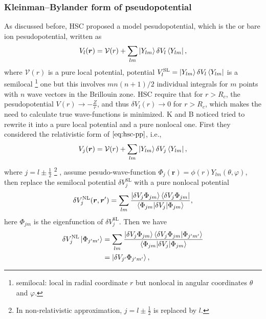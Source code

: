 
\subsubsection{Kleinman--Bylander form of pseudopotential}
As discussed before,
HSC proposed a model pesudopotential, which is the or bare ion pesudopotential, written as
\begin{equation}\label{eq:hsc-pp}
	V_l(\bm{r}) = \mathcal{V} (r) + \sum_{l m} \ket{Y_{lm}} \delta V_l \bra{Y_{lm}},
\end{equation}
where $\mathcal{V} (r)$ is a pure local potential, potential
$V_l^\text{SL} = \ket{Y_{lm}} \delta V_l \bra{Y_{lm}}$ is a semilocal
\footnote{
	semilocal: local in radial coordinate $r$ but nonlocal in angular coordinates $\theta$ and $\varphi$.
}
one but this involves $m n (n+1) / 2$ individual integrals for $m$ points
with $n$ wave vectors in the Brillouin zone.
HSC require that for $r > R_c$, the pesudopotential
$V (r) \rightarrow - \frac{ Z }{ r }$, and thus
$\delta V_l (r) \rightarrow 0 $ for $r > R_c$,
which makes the need to calculate true wave-functions is minimized.
K and B \cite{Kleinman:1982cx} noticed tried to rewrite it into a pure local potential and a pure
nonlocal one. First they considered the relativistic form of $\eqref{eq:hsc-pp}$,
i.e.,
\begin{equation}
	V_j(\bm{r}) = \mathcal{V} (r) + \sum_{lm} \ket{Y_{lm}} \delta V_j \bra{Y_{lm}},
\end{equation}
where $j = l \pm \frac{ 1 }{ 2 }$
\footnote{
	In non-relativistic approximation, $j = l \pm \frac{ 1 }{ 2 }$ is replaced by $l$.
}
, assume pesudo-wave-function
$\Phi_j (\bm{r}) = \phi(r) Y_{lm} (\theta, \varphi)$,
then replace the semilocal potential $\delta V_j^\text{SL}$ with a pure nonlocal potential
\begin{equation}\label{eq:nl-pp}
	\delta V_j^\text{NL} (\bm{r}, \bm{r}')
	= \sum_{lm} \frac{ \ket{\delta V_j \Phi_{jm}}  \bra{\delta V_j \Phi_{jm}} }{
		\braket{ \Phi_{jm} | \delta V_j | \Phi_{jm} } },
\end{equation}
here $\Phi_{jm}$ is the eigenfunction of $\delta V_j^\text{SL}$.
Then we have
\begin{equation}\label{eq:vnl-phi}
	\begin{split}
		\delta V_j^\text{NL} \ket{\Phi_{j'm'}}
		&=
		\sum_{lm} \frac{
			\ket{\delta V_j \Phi_{jm}}  \braket{\delta V_j \Phi_{jm} | \Phi_{j'm'} }
		}{
			\braket{ \Phi_{jm} | \delta V_j | \Phi_{jm} }
		} \\
		&= \ket{ \delta V_{j'} \Phi_{j'm'} },
	\end{split}
\end{equation}
